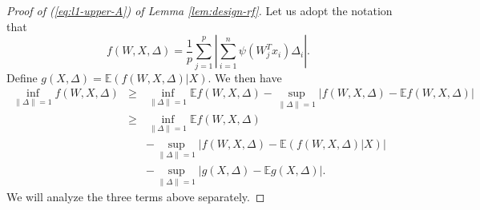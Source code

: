 \begin{proof}[Proof of (\ref{eq:l1-upper-A}) of Lemma \ref{lem:design-rf}]
Let us adopt the notation that
$$f(W,X,\Delta)=\frac{1}{p}\sum_{j=1}^p\left|\sum_{i=1}^n\psi(W_j^Tx_i)\Delta_i\right|.$$
Define $g(X,\Delta)=\mathbb{E}(f(W,X,\Delta)|X)$.
We then have
\begin{eqnarray}
\nonumber \inf_{\|\Delta\|=1}f(W,X,\Delta) &\geq& \inf_{\|\Delta\|=1}\mathbb{E}f(W,X,\Delta) - \sup_{\|\Delta\|=1}\left|f(W,X,\Delta)-\mathbb{E}f(W,X,\Delta)\right| \\
\label{eq:exp-f-inf-relu} &\geq& \inf_{\|\Delta\|=1}\mathbb{E}f(W,X,\Delta) \\
\label{eq:ep-f-relu} && - \sup_{\|\Delta\|=1}\left|f(W,X,\Delta)-\mathbb{E}(f(W,X,\Delta)|X)\right| \\
\label{eq:ep-g-relu} && - \sup_{\|\Delta\|=1}\left|g(X,\Delta)-\mathbb{\mathbb{E}}g(X,\Delta)\right|.
\end{eqnarray}
We will analyze the three terms above separately.


\end{proof}
